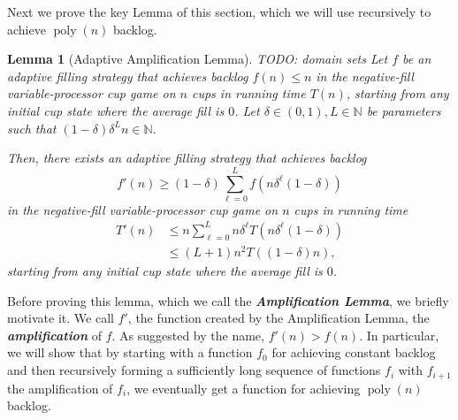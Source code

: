 \documentclass[twocolumn]{article}[10pt]
\newcommand{\defn}[1]{{\textit{\textbf{\boldmath #1}}}\xspace}
\DeclareMathOperator{\poly}{\text{poly}}
\newtheorem{lemma}{Lemma}
\begin{document}
Next we prove the key Lemma of this section, which we will use recursively to achieve $\poly(n)$ backlog.
\begin{lemma}[Adaptive Amplification Lemma]\label{lem:adaptiveAmplification}
{\color{red} TODO: domain sets}
  Let $f$ be an adaptive filling strategy that achieves backlog $f(n) \le n$ in the negative-fill variable-processor cup game on $n$ cups in running time $T(n)$, starting from any initial cup state where the average fill is $0$.
  Let $\delta\in(0,1), L\in \mathbb{N}$ be parameters such that  $(1-\delta)\delta^L n \in \mathbb{N}$.

  Then, there exists an adaptive filling strategy that achieves backlog 
  $$f'(n) \ge (1-\delta)\sum_{\ell= 0}^{L} f(n\delta^\ell(1-\delta))$$
  in the negative-fill variable-processor cup game on $n$ cups in running time 
  \begin{align*}
    T'(n) &\le n\sum_{\ell=0}^L n\delta^\ell T(n\delta^\ell(1-\delta)) \\
  &\le (L+1)n^2 T((1-\delta)n),
  \end{align*}
  starting from any initial cup state where the average fill is $0$.
\end{lemma}

Before proving this lemma, which we call the
  \defn{Amplification Lemma}, we briefly motivate it. 
  We call $f'$, the function created by the Amplification
  Lemma, the \defn{amplification} of $f$.
  As suggested by the name, $f'(n) > f(n)$. In particular, we
  will show that by starting with a function $f_0$ for achieving
  constant backlog and then recursively forming a sufficiently
  long sequence of functions $f_i$ with $f_{i+1}$ the
  amplification of $f_i$, we eventually get a function for
  achieving $\poly(n)$ backlog.
  
\end{document}
